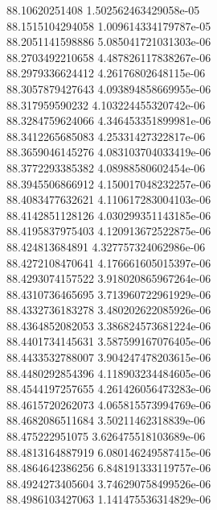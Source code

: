 {88.10620251408 1.502562463429058e-05 \\
88.1515104294058 1.009614334179787e-05 \\
88.2051141598886 5.085041721031303e-06 \\
88.2703492210658 4.487826117838267e-06 \\
88.2979336624412 4.26176802648115e-06 \\
88.3057879427643 4.093894858669955e-06 \\
88.317959590232 4.103224455320742e-06 \\
88.3284759624066 4.346453351899981e-06 \\
88.3412265685083 4.25331427322817e-06 \\
88.3659046145276 4.083103704033419e-06 \\
88.3772293385382 4.08988580602454e-06 \\
88.3945506866912 4.150017048232257e-06 \\
88.4083477632621 4.110617283004103e-06 \\
88.4142851128126 4.030299351143185e-06 \\
88.4195837975403 4.120913672522875e-06 \\
88.424813684891 4.327757324062986e-06 \\
88.4272108470641 4.176661605015397e-06 \\
88.4293074157522 3.918020865967264e-06 \\
88.4310736465695 3.713960722961929e-06 \\
88.4332736183278 3.480202622085926e-06 \\
88.4364852082053 3.386824573681224e-06 \\
88.4401734145631 3.587599167076405e-06 \\
88.4433532788007 3.904247478203615e-06 \\
88.4480292854396 4.118903234484605e-06 \\
88.4544197257655 4.261426056473283e-06 \\
88.4615720262073 4.065815573994769e-06 \\
88.4682086511684 3.50211462318839e-06 \\
88.475222951075 3.626475518103689e-06 \\
88.4813164887919 6.080146249587415e-06 \\
88.4864642386256 6.848191333119757e-06 \\
88.4924273405604 3.746290758499526e-06 \\
88.4986103427063 1.141475536314829e-06 \\
}
